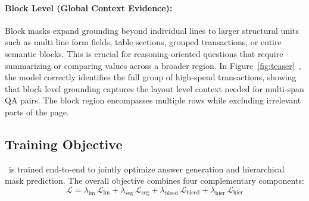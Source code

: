 \paragraph{Block Level (Global Context Evidence):}
Block masks expand grounding beyond individual lines to larger structural units such as multi line form fields, table sections, grouped transactions, or entire semantic blocks. 
This is crucial for reasoning-oriented questions that require summarizing or comparing values across a broader region.
In Figure~\ref{fig:teaser}~, the model correctly identifies the full group of high-spend transactions, showing that block level grounding captures the layout level context needed for multi-span QA pairs. 
The block region encompasses multiple rows while excluding irrelevant parts of the page.



\subsection{Training Objective}

\modelName\ is trained end-to-end to jointly optimize answer generation and hierarchical mask prediction. 
The overall objective combines four complementary components:
\[
\mathcal{L} =
\lambda_{\mathrm{lm}}\,\mathcal{L}_{\mathrm{lm}}
+ \lambda_{\mathrm{seg}}\,\mathcal{L}_{\mathrm{seg}}
+ \lambda_{\mathrm{bleed}}\,\mathcal{L}_{\mathrm{bleed}}
+ \lambda_{\mathrm{hier}}\,\mathcal{L}_{\mathrm{hier}}
\]

